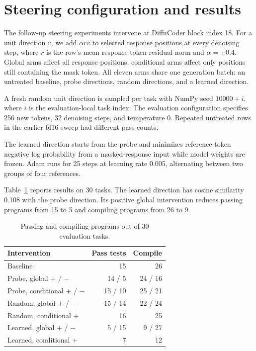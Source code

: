 \clearpage
\section{Steering configuration and results}\label{app:steering}

The follow-up steering experiments intervene at DiffuCoder block index 18. For a unit direction $v$, we add $\alpha\bar r v$ to selected response positions at every denoising step, where $\bar r$ is the row's mean response-token residual norm and $\alpha=\pm0.4$. Global arms affect all response positions; conditional arms affect only positions still containing the mask token. All eleven arms share one generation batch: an untreated baseline, probe directions, random directions, and a learned direction.

A fresh random unit direction is sampled per task with NumPy seed $10000+i$, where $i$ is the evaluation-local task index. The evaluation configuration specifies 256 new tokens, 32 denoising steps, and temperature 0. Repeated untreated rows in the earlier bf16 sweep had different pass counts.

The learned direction starts from the probe and minimizes reference-token negative log probability from a masked-response input while model weights are frozen. Adam runs for 25 steps at learning rate 0.005, alternating between two groups of four references.

Table~\ref{tab:steerarms} reports results on 30 tasks. The learned direction has cosine similarity 0.108 with the probe direction. Its positive global intervention reduces passing programs from 15 to 5 and compiling programs from 26 to 9.

\begin{table}[htbp]
\centering\small
\caption{Passing and compiling programs out of 30 evaluation tasks.}
\label{tab:steerarms}
\begin{tabular}{@{}lrr@{}}
\toprule
Intervention & Pass tests & Compile\\
\midrule
Baseline & 15 & 26\\
Probe, global $+$ / $-$ & 14 / 5 & 24 / 16\\
Probe, conditional $+$ / $-$ & 15 / 10 & 25 / 21\\
Random, global $+$ / $-$ & 15 / 14 & 22 / 24\\
Random, conditional $+$ & 16 & 25\\
Learned, global $+$ / $-$ & 5 / 15 & 9 / 27\\
Learned, conditional $+$ & 7 & 12\\
\bottomrule
\end{tabular}
\end{table}

